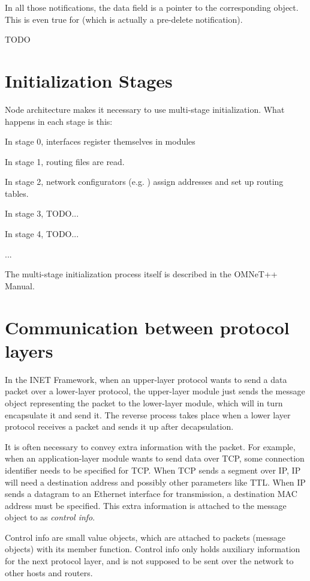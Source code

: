 In all those notifications, the data field is a pointer to the
corresponding  object. This is even true for
 (which is actually a pre-delete notification).
\fi

\ifdraft TODO
\section{Initialization Stages}

Node architecture makes it necessary to use multi-stage initialization.
What happens in each stage is this:

In stage 0, interfaces register themselves in  modules

In stage 1, routing files are read.

In stage 2, network configurators (e.g. )
assign addresses and set up routing tables.

In stage 3, TODO...

In stage 4, TODO...

...

The multi-stage initialization process itself is described in the OMNeT++ Manual.
\fi

\section{Communication between protocol layers}

In the INET Framework, when an upper-layer protocol wants to send a data
packet over a lower-layer protocol, the upper-layer module just sends the
message object representing the packet to the lower-layer module, which
will in turn encapsulate it and send it. The reverse process takes place
when a lower layer protocol receives a packet and sends it up after
decapsulation.

It is often necessary to convey extra information with the packet. For
example, when an application-layer module wants to send data over TCP, some
connection identifier needs to be specified for TCP. When TCP sends a
segment over IP, IP will need a destination address and possibly other
parameters like TTL. When IP sends a datagram to an Ethernet interface for
transmission, a destination MAC address must be specified. This extra
information is attached to the message object to as \textit{control info}.

Control info are small value objects, which are attached to packets
(message objects) with its  member function.
Control info only holds auxiliary information for the next protocol layer,
and is not supposed to be sent over the network to other hosts and routers.



